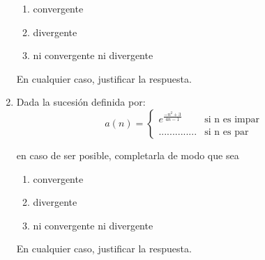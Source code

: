 \documentclass[12pt]{article}
\theoremstyle{definition}
\begin{document}
\begin{enumerate}
\begin{enumerate}
	\item convergente
	\item divergente
	\item ni convergente ni divergente
\end{enumerate}
En cualquier caso, justificar la respuesta.

\item  
Dada la sucesión definida por:
\begin{equation*}
	a(n) =
	\begin{cases} 
		e^{\frac{-n^2+3}{4n-1}}  & \text{si  n es impar} \\
		..............& \text{si  n es par}
	\end{cases}
\end{equation*}

en caso de ser posible, completarla de modo que sea

\begin{enumerate}
	\item convergente
	\item divergente
	\item ni convergente ni divergente
\end{enumerate}
En cualquier caso, justificar la respuesta.
\end{enumerate}
\end{document}
